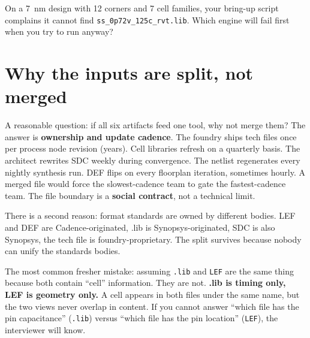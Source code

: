 \begin{gut}
On a 7~nm design with 12 corners and 7 cell families, your bring-up script complains it cannot find \texttt{ss\_0p72v\_125c\_rvt.lib}. Which engine will fail first when you try to run anyway?
\end{gut}

\section{Why the inputs are split, not merged}

\begin{sidebar}
A reasonable question: if all six artifacts feed one tool, why not merge them? The answer is \textbf{ownership and update cadence}. The foundry ships tech files once per process node revision (years). Cell libraries refresh on a quarterly basis. The architect rewrites SDC weekly during convergence. The netlist regenerates every nightly synthesis run. DEF flips on every floorplan iteration, sometimes hourly. A merged file would force the slowest-cadence team to gate the fastest-cadence team. The file boundary is a \textbf{social contract}, not a technical limit.

There is a second reason: format standards are owned by different bodies. LEF and DEF are Cadence-originated, .lib is Synopsys-originated, SDC is also Synopsys, the tech file is foundry-proprietary. The split survives because nobody can unify the standards bodies.
\end{sidebar}

\begin{pitfall}
The most common fresher mistake: assuming \texttt{.lib} and \texttt{LEF} are the same thing because both contain ``cell'' information. They are not. \textbf{.lib is timing only, LEF is geometry only.} A cell appears in both files under the same name, but the two views never overlap in content. If you cannot answer ``which file has the pin capacitance'' (\texttt{.lib}) versus ``which file has the pin location'' (\texttt{LEF}), the interviewer will know.
\end{pitfall}

